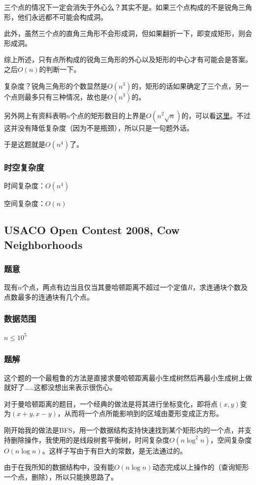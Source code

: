 \documentclass{ctexart}
\begin{document}
三个点的情况下一定会消失于外心么？其实不是。如果三个点构成的不是锐角三角形，他们永远都不可能会构成洞。

此外，虽然三个点的直角三角形不会形成洞，但如果翻折一下，即变成矩形，则会形成洞。

综上所述，只有点所构成的锐角三角形的外心以及矩形的中心才有可能会是答案。之后$O(n)$的判断一下。

复杂度？锐角三角形的个数显然是$O(n^3)$的，矩形的话如果确定了三个点，另一个点则最多只有三种情况，故也是$O(n^3)$的。

另外网上有资料表明$n$个点的矩形数目的上界是$O(n^2\sqrt{n})$的，可以看\href{http://foreseeable97.logdown.com/posts/184363-a-proof-problem}{这里}。不过这并没有降低复杂度（因为不是瓶颈），所以只是一句题外话。

于是这题就是$O(n^4)$了。
\subsubsection{时空复杂度}
时间复杂度：$O(n^4)$

空间复杂度：$O(n)$
\subsection{USACO Open Contest 2008, Cow Neighborhoods}
\subsubsection{题意}
现有$n$个点，两点有边当且仅当其曼哈顿距离不超过一个定值$R$，求连通块个数及点数最多的连通块有几个点。
\subsubsection{数据范围}
$n \le 10^5$
\subsubsection{题解}
这个题的一个最粗鲁的方法是直接求曼哈顿距离最小生成树然后再最小生成树上做就好了……这都没想出来表示很伤心。

对于曼哈顿距离的题目，一个经典的做法是将其进行坐标变化，即将点$(x,y)$变为$(x+y,x-y)$，从而将一个点所能影响到的区域由菱形变成正方形。

刚开始我的做法是BFS，用一个数据结构支持快速找到某个矩形内的一个点，并支持删除操作，我使用的是线段树套平衡树，时间复杂度$O(n \log^2 n)$，空间复杂度$O(n \log n)$。这样子写由于有巨大的常数，是无法通过的。

由于在我所知的数据结构中，没有能$O(n \log n)$动态完成以上操作的（查询矩形一个点，删除），所以只能换思路了。
\end{document}
